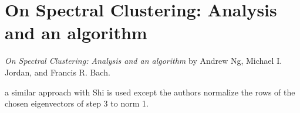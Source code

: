 \section{On Spectral Clustering: Analysis and an algorithm}
\label{ch:ng01}

\textit{On Spectral Clustering: Analysis and an algorithm} by Andrew Ng, Michael I. Jordan, and Francis R. Bach.
\newline

a similar approach with Shi is used except the authors normalize the rows of the chosen eigenvectors of step 3 to norm 1.


